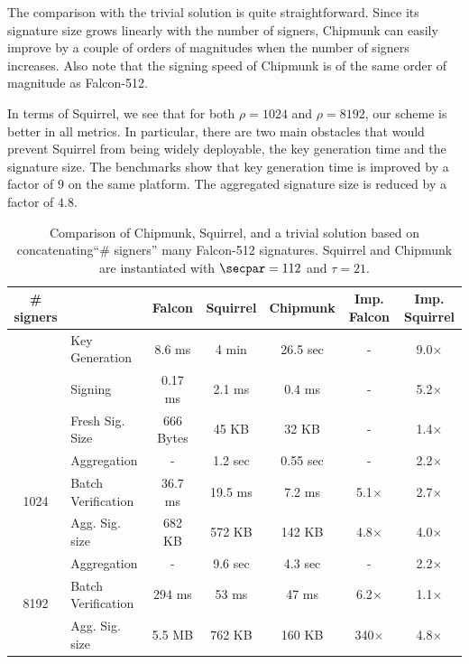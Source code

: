 The comparison with the trivial solution is quite straightforward.
Since its signature size grows linearly with the number of signers,
Chipmunk can easily improve by a couple of orders of magnitudes when the number of signers increases.
Also note that the signing speed of Chipmunk is of the same order of magnitude as Falcon-512.

In terms of Squirrel, we see that for both $\rho = 1024$ and $\rho = 8192$, our scheme is better in all metrics.
In particular, there are two main obstacles that would prevent Squirrel from being widely deployable, the key generation time and the signature size.
The benchmarks show that key generation time is improved by a factor of $9$ on the same platform.
The aggregated signature size is reduced by a factor of $4.8$.
\bgroup
\setlength{\tabcolsep}{0.5em}
\renewcommand{\arraystretch}{1.1}
\begin{table}\centering
  \begin{tabular}{clccccc}
    \# signers      &                 & Falcon      & Squirrel  & Chipmunk  & Imp. Falcon & Imp. Squirrel \\\toprule
    \multirow{2}{*}{} 
                    & Key Generation  & 8.6 ms      & 4 min     & 26.5 sec  &     -       & 9.0$\times$ \\%
                    & Signing         & 0.17 ms     & 2.1 ms    & 0.4 ms    &     -       & 5.2$\times$ \\%
                    &Fresh Sig. Size  & 666 Bytes   & 45 KB     & 32 KB     &     -       & 1.4$\times$ \\\midrule
    \multirow{3}{*}{1024}                
                    &Aggregation      & -           & 1.2 sec   & 0.55 sec  &     -       & 2.2$\times$ \\%
                    &Batch Verification    
                                      & 36.7 ms     & 19.5 ms   & 7.2 ms    & 5.1$\times$ & 2.7$\times$ \\%
                    
                    &Agg. Sig. size   & 682 KB      & 572 KB    & 142 KB    & 4.8$\times$ & 4.0$\times$ \\\midrule
    \multirow{3}{*}{8192}                
                    &Aggregation      & -           & 9.6 sec   & 4.3 sec   &     -       & 2.2$\times$ \\%
                    &Batch Verification    
                                      & 294 ms      & 53  ms    &  47 ms    & 6.2$\times$ & 1.1$\times$ \\%
                    &Agg. Sig. size   & 5.5 MB      & 762 KB    & 160 KB    & 340$\times$ & 4.8$\times$\\ \bottomrule
  \end{tabular}
  \caption{Comparison of Chipmunk, Squirrel, and a trivial solution based on concatenating``\# signers'' many Falcon-512 signatures. Squirrel and Chipmunk are instantiated with $\secpar = 112$ and $\tau=21$.}

\end{table}

